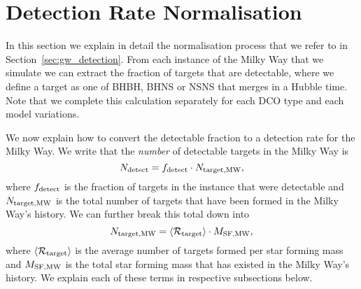 \section{Detection Rate Normalisation}\label{app:rate_normalisation}
In this section we explain in detail the normalisation process that we refer to in Section~\ref{sec:gw_detection}. From each instance of the Milky Way that we simulate we can extract the fraction of targets that are detectable, where we define a target as one of BHBH, BHNS or NSNS that merges in a Hubble time. Note that we complete this calculation separately for each DCO type and each model variations.

We now explain how to convert the detectable fraction to a detection rate for the Milky Way. We write that the \textit{number} of detectable targets in the Milky Way is
\begin{equation}\label{eq:norm_frame}
    N_{\rm detect} = f_{\rm detect} \cdot N_{\rm target, MW},
\end{equation}
where $f_{\rm detect}$ is the fraction of targets in the instance that were detectable and $N_{\rm target, MW}$ is the total number of targets that have been formed in the Milky Way's history. We can further break this total down into
\begin{equation}
    N_{\rm target, MW} = \avg{ \mathcal{R}_{\rm target} } \cdot M_{\rm SF, MW},
\end{equation}
where $\left\langle \mathcal{R}_{\rm target} \right\rangle$ is the average number of targets formed per star forming mass and $M_{\rm SF, MW}$ is the total star forming mass that has existed in the Milky Way's history. We explain each of these terms in respective subsections below.

